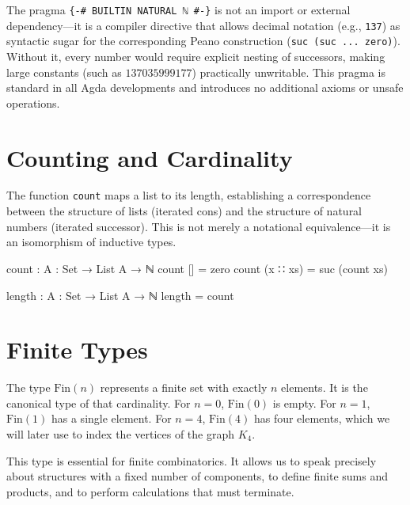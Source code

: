 \documentclass[11pt,a4paper]{book}
\begin{document}
The pragma \texttt{\{-\# BUILTIN NATURAL ℕ \#-\}} is not an import or external dependency—it 
is a compiler directive that allows decimal notation (e.g., \texttt{137}) as syntactic sugar 
for the corresponding Peano construction (\texttt{suc (suc ... zero)}). Without it, every 
number would require explicit nesting of successors, making large constants (such as 
$137035999177$) practically unwritable. This pragma is standard in all Agda developments 
and introduces no additional axioms or unsafe operations.

\section{Counting and Cardinality}

The function \texttt{count} maps a list to its length, establishing a correspondence 
between the structure of lists (iterated cons) and the structure of natural numbers 
(iterated successor). This is not merely a notational equivalence—it is an isomorphism 
of inductive types.

\begin{code}
count : {A : Set} → List A → ℕ
count []       = zero
count (x ∷ xs) = suc (count xs)

length : {A : Set} → List A → ℕ
length = count
\end{code}

\section{Finite Types}

The type $\mathrm{Fin}(n)$ represents a finite set with exactly $n$ elements. It is 
the canonical type of that cardinality. For $n = 0$, $\mathrm{Fin}(0)$ is empty. For 
$n = 1$, $\mathrm{Fin}(1)$ has a single element. For $n = 4$, $\mathrm{Fin}(4)$ has 
four elements, which we will later use to index the vertices of the graph $K_4$.

This type is essential for finite combinatorics. It allows us to speak precisely 
about structures with a fixed number of components, to define finite sums and products, 
and to perform calculations that must terminate.
\end{document}
